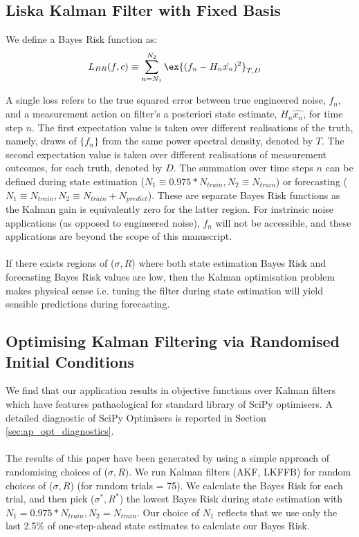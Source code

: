 \subsection{Liska Kalman Filter with Fixed Basis}

We define a Bayes Risk function as:
\begin{align}
L_{BR}(f, c) & \equiv \sum_{n=N_1}^{N_2}\ex{(f_n - H_n\hat{x_n})^2}_{T,D} \label{eqn:sec:ap_opt_LossBR}
\end{align}

A single loss refers to the true squared error between true engineered noise, $f_n$, and a measurement action on filter's a posteriori state estimate, $H_n\hat{x_n}$, for time step $n$. The first expectation value is  taken over different realisations of the truth, namely, draws of $\{f_n\}$ from the same power spectral density, denoted by $T$. The second expectation value is taken over different realisations of measurement outcomes, for each truth, denoted by $D$. The summation over time steps $n$ can be defined during state estimation ($N_1 \equiv 0.975 * N_{train}, N_2 \equiv N_{train}$) or forecasting ($N_1 \equiv N_{train}, N_2 \equiv N_{train} + N_{predict}$). These are separate Bayes Risk functions as the Kalman gain is equivalently zero for the latter region. For instrinsic noise applications (as opposed to engineered noise), ${f_n}$  will not be accessible, and these applications are beyond the scope of this manuscript. 
\\
\\
If there exists regions of ($\sigma, R$) where both state estimation Bayes Risk and forecasting Bayes Risk values are low, then the Kalman optimisation problem makes physical sense i.e. tuning the filter during state estimation will yield sensible predictions during forecasting. 

\subsection{Optimising Kalman Filtering via Randomised Initial Conditions}

We find that our application results in objective functions over Kalman filters which have features pathaological for standard library of SciPy optimisers. A detailed diagnostic of SciPy Optimisers is reported in Section \ref{sec:ap_opt_diagnostics}. 
\\
\\
The results of this paper have been generated by using a simple approach of randomising choices of ($\sigma, R$). We run  Kalman filters (AKF, LKFFB) for random choices of ($\sigma, R$) (for random trials = 75). We calculate the Bayes Risk for each trial, and then pick ($\sigma^*, R^*$) the lowest Bayes Risk during state estimation with $N_1 = 0.975 * N_{train}, N_2 = N_{train}$. Our choice of $N_1$ reflects that we use only the last 2.5\% of one-step-ahead state estimates to calculate our Bayes Risk.

